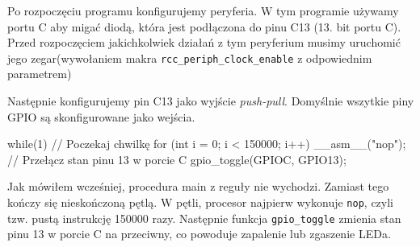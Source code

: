 Po rozpoczęciu programu konfigurujemy peryferia. W tym programie używamy portu C aby migać diodą, która jest podłączona do pinu C13
(13. bit portu C). Przed rozpoczęciem jakichkolwiek działań z tym peryferium musimy uruchomić jego zegar\footnotemark (wywołaniem makra
\Verb$rcc_periph_clock_enable$ z odpowiednim parametrem)

Następnie konfigurujemy pin C13 jako wyjście \textit{push-pull}. Domyślnie wszytkie piny GPIO są skonfigurowane jako wejścia.

\begin{CodeFrame*}[c]{}
  while(1){
    // Poczekaj chwilkę
    for (int i = 0; i < 150000; i++) __asm__("nop");
    // Przełącz stan pinu 13 w porcie C
    gpio_toggle(GPIOC, GPIO13); 
  }
\end{CodeFrame*}

Jak mówiłem wcześniej, procedura main z reguły nie wychodzi. Zamiast tego kończy się nieskończoną pętlą. W pętli, procesor najpierw
wykonuje \texttt{nop}, czyli tzw. pustą instrukcję 150000 razy\footnotemark. Następnie funkcja \Verb$gpio_toggle$ zmienia stan pinu 13
w porcie C na przeciwny, co powoduje zapalenie lub zgaszenie LEDa.
